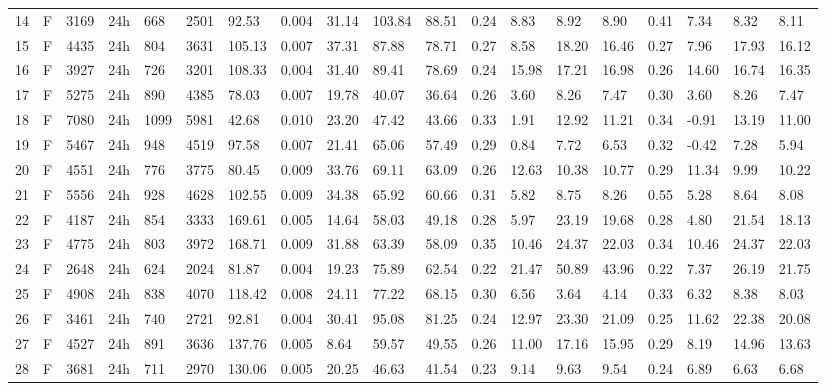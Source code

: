 \begin{tabular}{rllllllrlllllllllll}
14 & F & 3169 & 24h & 668 & 2501 & 92.53 & 0.004 & 31.14 & 103.84 & 88.51 & 0.24 & 8.83 & 8.92 & 8.90 & 0.41 & 7.34 & 8.32 & 8.11 \\
15 & F & 4435 & 24h & 804 & 3631 & 105.13 & 0.007 & 37.31 & 87.88 & 78.71 & 0.27 & 8.58 & 18.20 & 16.46 & 0.27 & 7.96 & 17.93 & 16.12 \\
16 & F & 3927 & 24h & 726 & 3201 & 108.33 & 0.004 & 31.40 & 89.41 & 78.69 & 0.24 & 15.98 & 17.21 & 16.98 & 0.26 & 14.60 & 16.74 & 16.35 \\
17 & F & 5275 & 24h & 890 & 4385 & 78.03 & 0.007 & 19.78 & 40.07 & 36.64 & 0.26 & 3.60 & 8.26 & 7.47 & 0.30 & 3.60 & 8.26 & 7.47 \\
18 & F & 7080 & 24h & 1099 & 5981 & 42.68 & 0.010 & 23.20 & 47.42 & 43.66 & 0.33 & 1.91 & 12.92 & 11.21 & 0.34 & -0.91 & 13.19 & 11.00 \\
19 & F & 5467 & 24h & 948 & 4519 & 97.58 & 0.007 & 21.41 & 65.06 & 57.49 & 0.29 & 0.84 & 7.72 & 6.53 & 0.32 & -0.42 & 7.28 & 5.94 \\
20 & F & 4551 & 24h & 776 & 3775 & 80.45 & 0.009 & 33.76 & 69.11 & 63.09 & 0.26 & 12.63 & 10.38 & 10.77 & 0.29 & 11.34 & 9.99 & 10.22 \\
21 & F & 5556 & 24h & 928 & 4628 & 102.55 & 0.009 & 34.38 & 65.92 & 60.66 & 0.31 & 5.82 & 8.75 & 8.26 & 0.55 & 5.28 & 8.64 & 8.08 \\
22 & F & 4187 & 24h & 854 & 3333 & 169.61 & 0.005 & 14.64 & 58.03 & 49.18 & 0.28 & 5.97 & 23.19 & 19.68 & 0.28 & 4.80 & 21.54 & 18.13 \\
23 & F & 4775 & 24h & 803 & 3972 & 168.71 & 0.009 & 31.88 & 63.39 & 58.09 & 0.35 & 10.46 & 24.37 & 22.03 & 0.34 & 10.46 & 24.37 & 22.03 \\
24 & F & 2648 & 24h & 624 & 2024 & 81.87 & 0.004 & 19.23 & 75.89 & 62.54 & 0.22 & 21.47 & 50.89 & 43.96 & 0.22 & 7.37 & 26.19 & 21.75 \\
25 & F & 4908 & 24h & 838 & 4070 & 118.42 & 0.008 & 24.11 & 77.22 & 68.15 & 0.30 & 6.56 & 3.64 & 4.14 & 0.33 & 6.32 & 8.38 & 8.03 \\
26 & F & 3461 & 24h & 740 & 2721 & 92.81 & 0.004 & 30.41 & 95.08 & 81.25 & 0.24 & 12.97 & 23.30 & 21.09 & 0.25 & 11.62 & 22.38 & 20.08 \\
27 & F & 4527 & 24h & 891 & 3636 & 137.76 & 0.005 & 8.64 & 59.57 & 49.55 & 0.26 & 11.00 & 17.16 & 15.95 & 0.29 & 8.19 & 14.96 & 13.63 \\
28 & F & 3681 & 24h & 711 & 2970 & 130.06 & 0.005 & 20.25 & 46.63 & 41.54 & 0.23 & 9.14 & 9.63 & 9.54 & 0.24 & 6.89 & 6.63 & 6.68 \\

\end{tabular}
